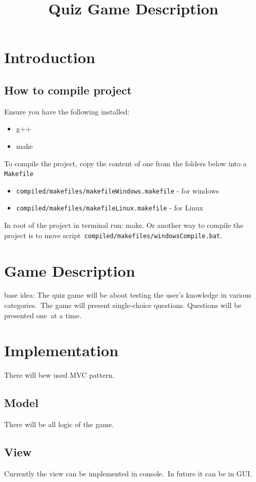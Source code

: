 \documentclass[a4paper,12pt]{article}
\title{Quiz Game Description}
\author{}
\date{}
\begin{document}
\maketitle

\section{Introduction}
\subsection{How to compile project}
Ensure you have the following installed:
\begin{itemize}
    \item g++
    \item make
\end{itemize}

To compile the project, copy the content of one from the folders below into a \texttt{Makefile}
\begin{itemize}
    \item \texttt{compiled/makefiles/makefileWindows.makefile} - for windows
    \item \texttt{compiled/makefiles/makefileLinux.makefile} - for Linux
\end{itemize}
In root of the project in terminal run: make. \newline
Or another way to compile the project is to move script\
\texttt{compiled/makefiles/windowsCompile.bat}.

\section{Game Description}
base idea:
The quiz game will be about testing the user's knowledge in various categories.\
The game will present single-choice questions. Questions will be presented one\
at a time.

\section{Implementation}
There will bew used MVC pattern.\
\subsection{Model}
There will be all logic of the game.
\subsection{View}
Currently the view can be implemented in console.\
In future it can be in GUI.
\end{document}
